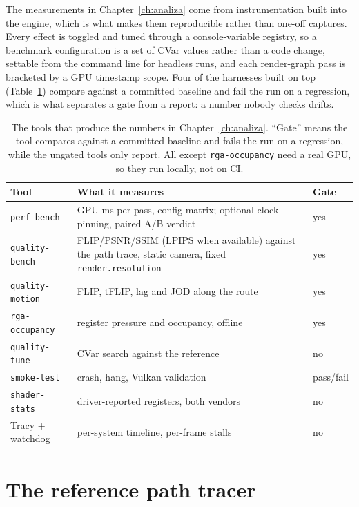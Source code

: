 The measurements in Chapter~\ref{ch:analiza} come from instrumentation built into the engine, which
is what makes them reproducible rather than one-off captures. Every effect is toggled and tuned
through a console-variable registry, so a benchmark configuration is a set of CVar values rather than
a code change, settable from the command line for headless runs, and each render-graph pass is
bracketed by a GPU timestamp scope. Four of the harnesses built on top (Table~\ref{tab:tooling})
compare against a committed baseline and fail the run on a regression, which is what separates a gate
from a report: a number nobody checks drifts.

\begin{table}[tbp]
\caption[Measurement tooling]{The tools that produce the numbers in Chapter~\ref{ch:analiza}.
``Gate'' means the tool compares against a committed baseline and fails the run on a regression,
while the ungated tools only report. All except \texttt{rga-occupancy} need a real GPU, so they run
locally, not on CI.}
\label{tab:tooling}
\centering
\begin{tabular}{lll}
\toprule
Tool & What it measures & Gate \\
\midrule
\texttt{perf-bench}     & GPU ms per pass, config matrix; optional clock pinning, paired A/B verdict & yes \\
\texttt{quality-bench}  & FLIP/PSNR/SSIM (LPIPS when available) against the path trace, static camera, fixed \texttt{render.resolution} & yes \\
\texttt{quality-motion} & FLIP, tFLIP, lag and JOD along the route & yes \\
\texttt{rga-occupancy}  & register pressure and occupancy, offline & yes \\
\texttt{quality-tune}   & CVar search against the reference & no \\
\texttt{smoke-test}     & crash, hang, Vulkan validation & pass/fail \\
\texttt{shader-stats}   & driver-reported registers, both vendors & no \\
Tracy + watchdog        & per-system timeline, per-frame stalls & no \\
\bottomrule
\end{tabular}
\end{table}

\section{The reference path tracer}
\label{sec:pathtracer}

